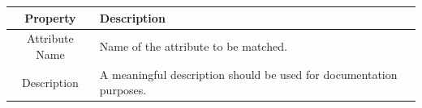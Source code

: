 \begin{figure}[h]
\begin{center}
  \caption{}
  \label{fig:match_attribute_examples}
\end{center}
\end{figure}

\begin{center}
  \begin{tabular}{ | c | p{\paragraphsize} | }
    \hline
    \textbf{Property} & \textbf{Description} \\ \hline
    Attribute Name & Name of the attribute to be matched.  \\ \hline
    Description & A meaningful description should be used for documentation
  purposes. \\ \hline
  \end{tabular}
\end{center}

